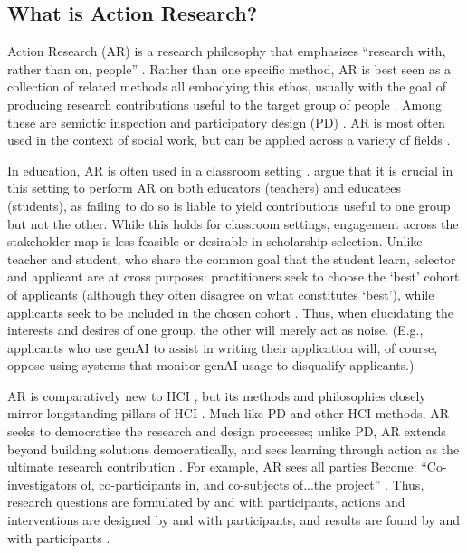 \subsection{What is Action Research?}\label{ssec:par}
Action Research (AR) is a research philosophy that emphasises ``research with, rather than on, people'' \cite{bradbury_action_2003}. Rather than one specific method, AR is best seen as a collection of related methods all embodying this ethos, usually with the goal of producing research contributions useful to the target group of people \cite{lu_organizing_2023}. Among these are semiotic inspection \cite{DeSouza_Leitão_2009,Alvarado_Waern_2018} and participatory design  (PD) \cite{braun_using_2006,Griffiths_Johnson_Hartley_2007,blythe2014research,Knapp_Zeratzky_Kowitz_2016}. AR is most often used in the context of social work, but can be applied across a variety of fields \cite{dombrowski_social_2016,lu_organizing_2023}. 

In education, AR is often used in a classroom setting \cite{Mertler_2019}. \textcite{Venn-Wycherley_Kharrufa_Lechelt_Nicholson_Howland_Almjally_Trory_Sarangapani_2024} argue that it is crucial in this setting to perform AR on both educators (teachers) and educatees (students), as failing to do so is liable to yield contributions useful to one group but not the other. While this holds for classroom settings, engagement across the stakeholder map is less feasible or desirable in scholarship selection. Unlike teacher and student, who share the common goal that the student learn, selector and applicant are at cross purposes: practitioners seek to choose the `best' cohort of applicants (although they often disagree on what constitutes `best'), while applicants seek to be included in the chosen cohort \cite{bergman2021seven}. Thus, when elucidating the interests and desires of one group, the other will merely act as noise. (E.g., applicants who use genAI to assist in writing their application will, of course, oppose using systems that monitor genAI usage to disqualify applicants.)

AR is comparatively new to HCI \cite{Hayes_2011,lu_organizing_2023}, but its methods and philosophies closely mirror longstanding pillars of HCI \cite{Hayes_2011}. Much like PD and other HCI methods, AR seeks to democratise the research and design processes; unlike PD, AR extends beyond building solutions democratically, and sees learning through action as the ultimate research contribution \cite{Hayes_2011}. For example, AR sees all parties Become: ``Co-investigators of, co-participants in, and co-subjects of...the project'' \cite{Hayes_2011}.  Thus, research questions are formulated by and with participants, actions and interventions are designed by and with participants, and results are found by and with participants \cite{Hayes_2011}.


